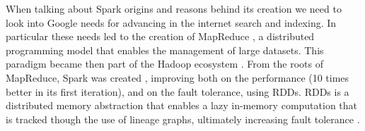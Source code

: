When talking about Spark origins and reasons behind its creation we need to look into Google needs for advancing in the internet search and indexing. In particular these needs led to the creation of MapReduce \cite{deanMapReduceSimplifiedData2008}, a distributed programming model that enables the management of large datasets. This paradigm became then part of the Hadoop ecosystem \cite{ApacheHadoop}. 
From the roots of MapReduce, Spark was created \cite{zahariaApacheSparkUnified2016}, improving both on the performance (10 times better in its first iteration), and on the fault tolerance, using \glspl{RDD}. \glspl{RDD} is a distributed memory abstraction that enables a lazy in-memory computation that is tracked though the use of lineage graphs, ultimately increasing fault tolerance \cite{Zaharia:EECS-2011-82}.